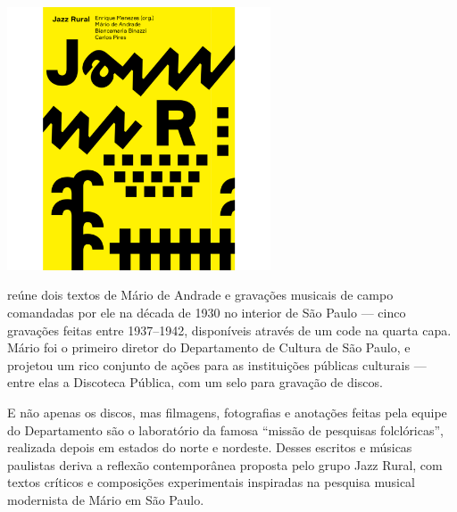 \pagebreak



\begin{center}
\hspace*{-3.5cm}
\hspace*{3cm}\includegraphics[width=78mm]{./grid/jazz.jpg}
\end{center}

\hspace*{-7cm}\hrulefill\hspace*{-7cm}

\medskip

 reúne dois textos de Mário de Andrade e gravações musicais de campo comandadas por ele na década de 1930 no interior de São Paulo --- cinco gravações feitas entre 1937--1942, disponíveis através de um  code na quarta capa. Mário foi o primeiro diretor do Departamento de Cultura de São Paulo, e projetou um rico conjunto de ações para as instituições públicas culturais --- entre elas a Discoteca Pública, com um selo para gravação de discos.

E não apenas os discos, mas filmagens, fotografias e anotações feitas pela equipe do Departamento são o laboratório da famosa “missão de pesquisas folclóricas”, realizada depois em estados do norte e nordeste. Desses escritos e músicas paulistas deriva a reflexão contemporânea proposta pelo grupo Jazz Rural, com textos críticos e composições experimentais inspiradas na pesquisa musical modernista de Mário em São Paulo.

\vfill

\hspace*{-.4cm}\begin{minipage}[c]{.5\linewidth}
\small{
{}}
\end{minipage}

